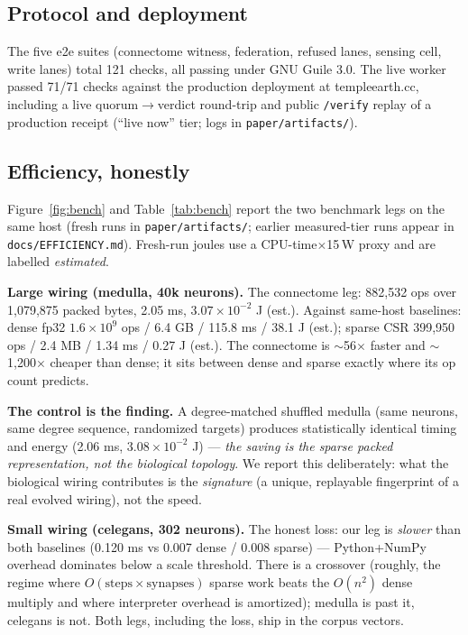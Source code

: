 \documentclass[pdflatex,sn-basic]{sn-jnl}
\begin{document}
\subsection{Protocol and deployment}
The five e2e suites (connectome witness, federation, refused lanes,
sensing cell, write lanes) total 121 checks, all passing under GNU
Guile 3.0. The live worker passed 71/71 checks against the production
deployment at templeearth.cc, including a live quorum$\to$verdict
round-trip and public \texttt{/verify} replay of a production
receipt (``live now'' tier; logs in \texttt{paper/artifacts/}).

\subsection{Efficiency, honestly}\label{sec:efficiency}
Figure~\ref{fig:bench} and Table~\ref{tab:bench} report the two
benchmark legs on the same host (fresh runs in
\texttt{paper/artifacts/}; earlier measured-tier runs appear in
\texttt{docs/EFFICIENCY.md}). Fresh-run joules use a
CPU-time$\times$15\,W proxy and are labelled \emph{estimated}.

\textbf{Large wiring (medulla, 40k neurons).} The connectome leg:
882{,}532 ops over 1{,}079{,}875 packed bytes, 2.05 ms,
$3.07\times10^{-2}$ J (est.). Against same-host baselines: dense fp32
$1.6\times10^9$ ops / 6.4 GB / 115.8 ms / 38.1 J (est.); sparse CSR
399{,}950 ops / 2.4 MB / 1.34 ms / 0.27 J (est.). The connectome is
$\sim$56$\times$ faster and $\sim$1{,}200$\times$ cheaper than dense;
it sits between dense and sparse exactly where its op count predicts.

\textbf{The control is the finding.} A degree-matched shuffled
medulla (same neurons, same degree sequence, randomized targets)
produces statistically identical timing and energy (2.06 ms,
$3.08\times10^{-2}$ J) --- \emph{the saving is the sparse packed
representation, not the biological topology}. We report this
deliberately: what the biological wiring contributes is the
\emph{signature} (a unique, replayable fingerprint of a real evolved
wiring), not the speed.

\textbf{Small wiring (celegans, 302 neurons).} The honest loss: our
leg is \emph{slower} than both baselines (0.120 ms vs 0.007 dense /
0.008 sparse) --- Python+NumPy overhead dominates below a scale
threshold. There is a crossover (roughly, the regime where
$O(\text{steps}\times\text{synapses})$ sparse work beats the
$O(n^2)$ dense multiply and where interpreter overhead is
amortized); medulla is past it, celegans is not. Both legs, including
the loss, ship in the corpus vectors.
\end{document}
